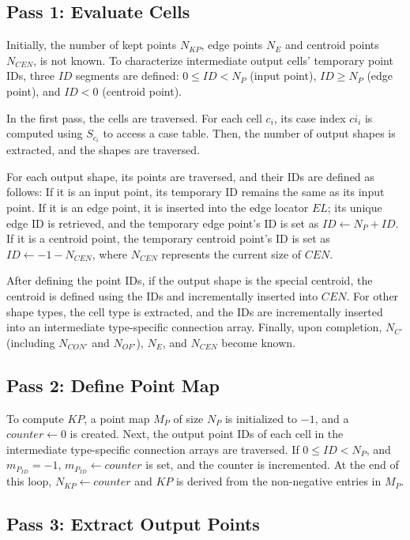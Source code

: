 \documentclass{egpubl}
\begin{document}
\subsection{Pass 1: Evaluate Cells}

Initially, the number of kept points $N_{KP}$, edge points $N_E$ and centroid points $N_{CEN}$, is not known. To characterize intermediate output cells' temporary point IDs, three $ID$ segments are defined:  $0 \leq ID < N_P$ (input point), $ID \geq N_P$ (edge point), and $ID < 0$ (centroid point).

In the first pass, the cells are traversed. For each cell $c_i$, its case index $ci_i$ is computed using $S_{c_i}$ to access a case table. Then, the number of output shapes is extracted, and the shapes are traversed.

For each output shape, its points are traversed, and their IDs are defined as follows: If it is an input point, its temporary ID remains the same as its input point. If it is an edge point, it is inserted into the edge locator $EL$; its unique edge ID is retrieved, and the temporary edge point's ID is set as $ID \gets N_{P} + ID$. If it is a centroid point, the temporary centroid point's ID is set as $ID \gets -1 - N_{CEN}$, where $N_{CEN}$ represents the current size of $CEN$.

After defining the point IDs, if the output shape is the special centroid, the centroid is defined using the IDs and incrementally inserted into $CEN$. For other shape types, the cell type is extracted, and the IDs are incrementally inserted into an intermediate type-specific connection array. Finally, upon completion, $N_{C'}$ (including $N_{CON'}$ and $N_{OF'}$), $N_E$, and $N_{CEN}$ become known.

\subsection{Pass 2: Define Point Map}

To compute $KP$, a point map $M_P$ of size $N_P$ is initialized to $-1$, and a $counter \gets 0$ is created. Next, the output point IDs of each cell in the intermediate type-specific connection arrays are traversed. If $0 \leq \textit{ID} < N_P$, and $m_{P_{ID}} = -1$, $m_{P_{ID}} \gets counter$ is set, and the counter is incremented. At the end of this loop, $N_{KP} \gets counter$ and $KP$ is derived
from the non-negative entries in $M_P$.

\subsection{Pass 3: Extract Output Points}
\end{document}
